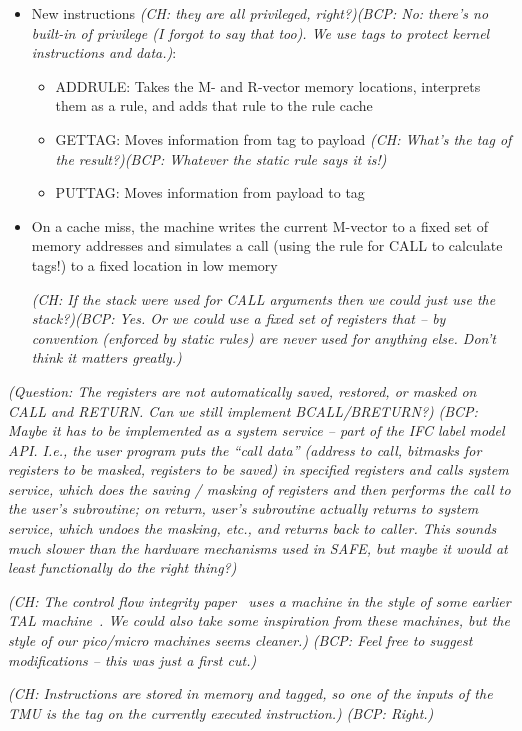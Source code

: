 \documentclass{article}
\newcommand{\finish}[1]{{\color{darkred}\em (#1)}}
\newcommand{\bcp}[1]{{\color{blue}\em (BCP: #1)}}
\newcommand{\ch}[1]{{\color{dkblue}\em (CH: #1)}}
\begin{document}
\begin{itemize}
\item New instructions \ch{they are all privileged, right?}\bcp{No: there's
  no built-in of privilege (I forgot to say that too).  We use tags to
  protect kernel instructions and data.}:
\begin{itemize}
\item ADDRULE: Takes the M- and R-vector memory locations, interprets them
as a rule, and adds that rule to the rule cache
\item GETTAG: Moves information from tag to payload
  \ch{What's the tag of the result?}\bcp{Whatever the static rule says it is!}
\item PUTTAG: Moves information from payload to tag
\end{itemize}
\item On a cache miss, the machine writes the current M-vector to a fixed
set of memory addresses and simulates a call (using the rule for CALL to
calculate tags!) to a fixed location in low memory

\ch{If the stack were used for CALL arguments then we could just use
  the stack?}\bcp{Yes.  Or we could use a fixed set of registers that -- by
  convention (enforced by static rules) are never used for anything else.
  Don't think it matters greatly.}
\end{itemize}

\finish{Question: The registers are not automatically saved, restored, or
  masked on CALL and RETURN.  Can we still implement BCALL/BRETURN?}
\bcp{Maybe it has to be implemented as a system service -- part of the IFC
  label model API.  I.e., the user program puts the ``call data'' (address
  to call, bitmasks for registers to be masked, registers to be saved) in
  specified registers and calls system service, which does the saving /
  masking of registers and then performs the call to the user's subroutine;
  on return, user's subroutine actually returns to system service, which
  undoes the masking, etc., and returns back to caller.  This sounds much
  slower than the hardware mechanisms used in SAFE, but maybe it would at
  least functionally do the right thing?}

\ch{The control flow integrity paper~\cite{AbadiBEL09} uses a machine
  in the style of some earlier TAL machine~\cite{HamidSTMN02}. We
  could also take some inspiration from these machines, but the style
  of our pico/micro machines seems cleaner.}
\bcp{Feel free to suggest modifications -- this was just a first cut.}

\ch{Instructions are stored in memory and tagged, so one of the inputs
  of the TMU is the tag on the currently executed instruction.}
\bcp{Right.}
\end{document}
